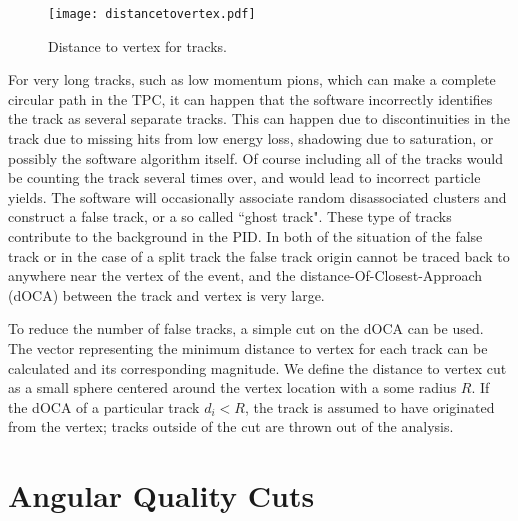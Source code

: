 \begin{figure}[!htb]
\centering
\texttt{[image: distancetovertex.pdf]}
\label{fig:poca}
\caption{Distance to vertex for tracks.}
\end{figure}

For very long tracks, such as low momentum pions, which can make a complete circular path in the TPC, it can happen that the software incorrectly identifies the track as several separate tracks. This can happen due to discontinuities in the track due to missing hits from low energy loss, shadowing due to saturation, or possibly the software algorithm itself. Of course including all of the tracks would be counting the track several times over, and would lead to incorrect particle yields. The software will occasionally associate random disassociated clusters and construct a false track, or a so called ``ghost track". These type of tracks contribute to the background in the PID. In both of the situation of the false track or in the case of a split track the false track origin cannot be traced back to anywhere near the vertex of the event, and the distance-Of-Closest-Approach (dOCA) between the track and vertex is very large. 

To reduce the number of false tracks, a simple cut on the dOCA can be used. The vector representing the minimum distance to vertex for each track can be calculated and its corresponding magnitude. We define the distance to vertex cut as a small sphere centered around the vertex location with a some radius $R$. If the dOCA of a particular track $d_i < R$, the track is assumed to have originated from the vertex; tracks outside of the cut are thrown out of the analysis. 






\section{Angular Quality Cuts}

